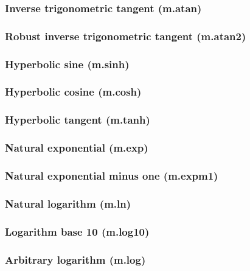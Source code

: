 \documentclass{article}
\theoremstyle{definition}
\begin{document}
\subsubsection{Inverse trigonometric tangent (m.atan)}

\subsubsection{Robust inverse trigonometric tangent (m.atan2)}

\subsubsection{Hyperbolic sine (m.sinh)}

\subsubsection{Hyperbolic cosine (m.cosh)}

\subsubsection{Hyperbolic tangent (m.tanh)}

\subsubsection{Natural exponential (m.exp)}

\subsubsection{Natural exponential minus one (m.expm1)}

\subsubsection{Natural logarithm (m.ln)}

\subsubsection{Logarithm base 10 (m.log10)}

\subsubsection{Arbitrary logarithm (m.log)}
\end{document}
